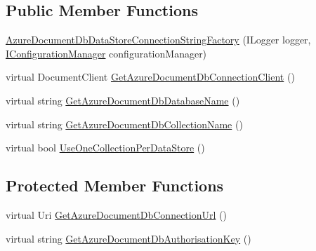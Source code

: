 \subsection*{Public Member Functions}
\begin{DoxyCompactItemize}
\item 
\hyperlink{classCqrs_1_1Azure_1_1DocumentDb_1_1Factories_1_1AzureDocumentDbDataStoreConnectionStringFactory_a9b08d89df792a20e71f5278dbf39b804_a9b08d89df792a20e71f5278dbf39b804}{Azure\+Document\+Db\+Data\+Store\+Connection\+String\+Factory} (I\+Logger logger, \hyperlink{interfaceCqrs_1_1Configuration_1_1IConfigurationManager}{I\+Configuration\+Manager} configuration\+Manager)
\item 
virtual Document\+Client \hyperlink{classCqrs_1_1Azure_1_1DocumentDb_1_1Factories_1_1AzureDocumentDbDataStoreConnectionStringFactory_a0525c318c3930076e08ed83f9829ab2c_a0525c318c3930076e08ed83f9829ab2c}{Get\+Azure\+Document\+Db\+Connection\+Client} ()
\item 
virtual string \hyperlink{classCqrs_1_1Azure_1_1DocumentDb_1_1Factories_1_1AzureDocumentDbDataStoreConnectionStringFactory_a2a30d6066e2bc9c4af078b1f0a5407ab_a2a30d6066e2bc9c4af078b1f0a5407ab}{Get\+Azure\+Document\+Db\+Database\+Name} ()
\item 
virtual string \hyperlink{classCqrs_1_1Azure_1_1DocumentDb_1_1Factories_1_1AzureDocumentDbDataStoreConnectionStringFactory_a0685593d04e9a905d270800c278ddb42_a0685593d04e9a905d270800c278ddb42}{Get\+Azure\+Document\+Db\+Collection\+Name} ()
\item 
virtual bool \hyperlink{classCqrs_1_1Azure_1_1DocumentDb_1_1Factories_1_1AzureDocumentDbDataStoreConnectionStringFactory_a736e0967785b1391ec21989a3f005c01_a736e0967785b1391ec21989a3f005c01}{Use\+One\+Collection\+Per\+Data\+Store} ()
\end{DoxyCompactItemize}
\subsection*{Protected Member Functions}
\begin{DoxyCompactItemize}
\item 
virtual Uri \hyperlink{classCqrs_1_1Azure_1_1DocumentDb_1_1Factories_1_1AzureDocumentDbDataStoreConnectionStringFactory_af5d090f6195c7b59183db1eec8dcafc0_af5d090f6195c7b59183db1eec8dcafc0}{Get\+Azure\+Document\+Db\+Connection\+Url} ()
\item 
virtual string \hyperlink{classCqrs_1_1Azure_1_1DocumentDb_1_1Factories_1_1AzureDocumentDbDataStoreConnectionStringFactory_a794c6926a7b29f927d41a0160716972a_a794c6926a7b29f927d41a0160716972a}{Get\+Azure\+Document\+Db\+Authorisation\+Key} ()
\end{DoxyCompactItemize}

